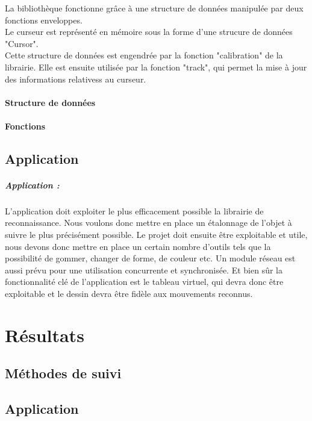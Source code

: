 \documentclass{report}
\begin{document}
			La bibliothèque fonctionne grâce à une structure de données manipulée par deux fonctions enveloppes. \\
			Le curseur est représenté en mémoire sous la forme d'une strucure de données "Cursor". \\
			Cette structure de données est engendrée par la fonction "calibration" de la librairie. Elle est ensuite utilisée par la fonction "track", qui permet la mise à jour des informations relativess au curseur.
					
				\newpage
				\subsubsection{Structure de données}
				\subsubsection{Fonctions}
			\subsection{}
		\section{Application}
	\paragraph{Application :\\}
L'application doit exploiter le plus efficacement possible la librairie de reconnaissance. Nous voulons donc mettre en place un étalonnage de l'objet à suivre le plus précisément possible. Le projet doit ensuite être exploitable et utile, nous devons donc mettre en place un certain nombre d'outils tels que la possibilité de gommer, changer de forme, de couleur etc. 
Un module réseau est aussi prévu pour une utilisation concurrente et synchronisée. Et bien sûr la fonctionnalité clé de l'application est le tableau virtuel, qui devra donc être exploitable et le dessin devra être fidèle aux mouvements reconnus.
	\chapter{Résultats}
		\section{Méthodes de suivi}
		\section{Application}
	
\end{document}
